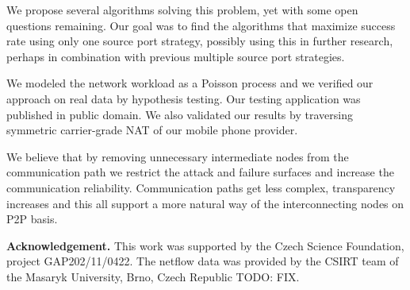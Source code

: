 \documentclass{acm_proc_article-sp}
\begin{document}
We propose several algorithms solving this problem, yet with some open questions remaining. 
Our goal was to find the algorithms that maximize success rate using only one source port strategy, possibly using this
in further research, perhaps in combination with previous multiple source port strategies.

We modeled the network workload as a Poisson process and we verified our approach on real data by hypothesis testing.
Our testing application was published in public domain. We also validated our results by traversing symmetric 
carrier-grade NAT of our mobile phone provider.

We believe that by removing unnecessary intermediate nodes from
the communication path we restrict the attack and failure surfaces and increase the communication reliability.
Communication paths get less complex, transparency increases and this all support a more natural way of the 
interconnecting nodes on P2P basis.

\par\smallskip
\noindent\textbf{Acknowledgement.} 
This work was supported by the Czech Science Foundation, project GAP202/11/0422. The netflow data was provided
by the CSIRT team of the Masaryk University, Brno, Czech Republic TODO: FIX.

% 



\end{document}
